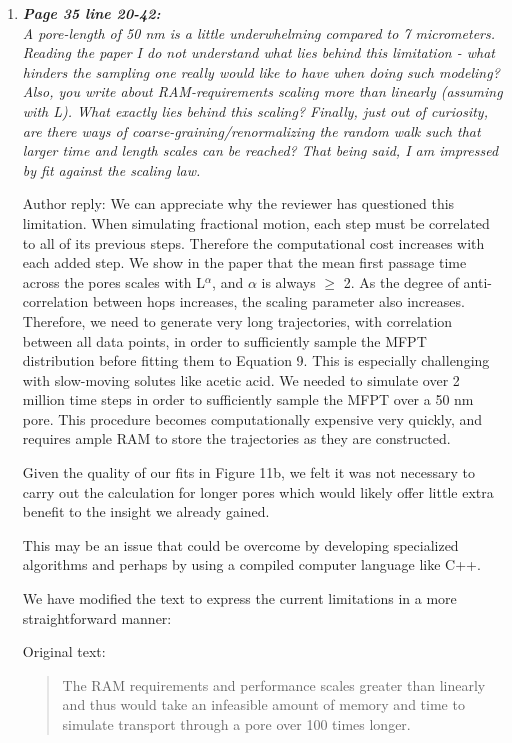 \documentclass{article}
\begin{document}
\begin{enumerate}[label={Comment \theenumi :}, leftmargin=3.9\parindent]
  \item \textit{\textbf{Page 35 line 20-42:}\\
        A pore-length of 50 nm is a little underwhelming compared to 7 micrometers. Reading the paper
		I do not understand what lies behind this limitation - what hinders the sampling one really would
		like to have when doing such modeling? Also, you write about RAM-requirements scaling more
		than linearly (assuming with L). What exactly lies behind this scaling? Finally, just out of
		curiosity, are there ways of coarse-graining/renormalizing the random walk such that larger time
		and length scales can be reached? That being said, I am impressed by fit against the scaling
	  	law.}
	  	  
	  	Author reply: We can appreciate why the reviewer has questioned this limitation.
		When simulating fractional motion, each step must be correlated to all of its previous 
		steps. Therefore the computational cost increases with each added step. We show in the paper
		that the mean first passage time across the pores scales with L$^{\alpha}$, and $\alpha$ is
		always $\geq$ 2. As the degree of anti-correlation between hops increases, the scaling
		parameter also increases. Therefore, we need to generate very long trajectories, with 
		correlation between all data points, in order to sufficiently sample the MFPT distribution 
		before fitting them to Equation 9. This is especially challenging with slow-moving solutes
		like acetic acid. We needed to simulate over 2 million time steps in order to sufficiently
		sample the MFPT over a 50 nm pore. This procedure becomes computationally expensive very
		quickly, and requires ample RAM to store the trajectories as they are constructed.
		
		Given the quality of our fits in Figure 11b, we felt it was not necessary to carry out the
		calculation for longer pores which would likely offer little extra benefit to the insight we
		already gained.
		 	
	  	This may be an issue that could be overcome by developing specialized algorithms and perhaps 
	  	by using a compiled computer language like C++. 
	  	
        We have modified the text to express the current limitations in a more straightforward manner:	  	
	  	
	  	Original text:
	  	\begin{quote}
	  	The RAM requirements and performance scales greater than linearly and thus would take an 
	  	infeasible amount of memory and time to simulate transport through a pore over 100 times
        longer. 
	  	\end{quote}


\end{enumerate}
\end{document}
